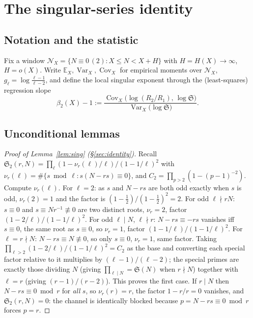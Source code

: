\documentclass[]{interact}%
\newcommand{\sing}{\mathfrak S}
\newcommand{\Var}{\operatorname{Var}}
\begin{document}
\section{The singular-series identity}
\label{app:identity}

\subsection{Notation and the statistic}
Fix a window $\mathcal N_X=\{N\equiv0\,(2):X\le N<X+H\}$ with $H=H(X)\to\infty$,
$H=o(X)$. Write $\mathbb E_X,\Var_X,\operatorname{Cov}_X$ for empirical moments over
$\mathcal N_X$, $g_\ell=\log\frac{\ell-1}{\ell-2}$, and define the local singular
exponent through the (least-squares) regression slope
\begin{equation}
  \beta_2(X)-1:=\frac{\operatorname{Cov}_X\!\big(\log(R_2/R_1),\,\log\sing\big)}
                     {\Var_X\!\big(\log\sing\big)} .
  \label{eq:beta-def}
\end{equation}

\subsection{Unconditional lemmas}

\begin{proof}[Proof of Lemma~\ref{lem:sing} (\S\ref{sec:identity})]
Recall $\sing_2(r,N)=\prod_{\ell}(1-\nu_r(\ell)/\ell)/(1-1/\ell)^2$ with
$\nu_r(\ell)=\#\{s\bmod\ell:s(N-rs)\equiv0\}$, and $C_2=\prod_{p>2}(1-(p-1)^{-2})$. Compute
$\nu_r(\ell)$. For $\ell=2$: as $s$ and $N-rs$ are both odd exactly when
$s$ is odd, $\nu_r(2)=1$ and the factor is $(1-\tfrac12)/(1-\tfrac12)^2=2$. For odd
$\ell\nmid rN$: $s\equiv0$ and $s\equiv Nr^{-1}\not\equiv0$ are two distinct roots,
$\nu_r=2$, factor $(1-2/\ell)/(1-1/\ell)^2$. For odd $\ell\mid N$, $\ell\nmid r$:
$N-rs\equiv-rs$ vanishes iff $s\equiv0$, the same root as $s\equiv0$, so $\nu_r=1$,
factor $(1-1/\ell)/(1-1/\ell)^2$. For $\ell=r\nmid N$: $N-rs\equiv N\not\equiv0$, so
only $s\equiv0$, $\nu_r=1$, same factor. Taking
$\prod_{\ell>2}(1-2/\ell)/(1-1/\ell)^2=C_2$ as the base and converting each special
factor relative to it multiplies by $(\ell-1)/(\ell-2)$; the special primes are
exactly those dividing $N$ (giving $\prod_{\ell\mid N}=\sing(N)$ when $r\nmid N$)
together with $\ell=r$ (giving $(r-1)/(r-2)$). This proves the first case. If
$r\mid N$ then $N-rs\equiv0\bmod r$ for \emph{all} $s$, so $\nu_r(r)=r$, the factor
$1-r/r=0$ vanishes, and $\sing_2(r,N)=0$: the channel is identically blocked because
$p=N-rs\equiv0\bmod r$ forces $p=r$.
\end{proof}
\end{document}
